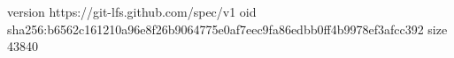 version https://git-lfs.github.com/spec/v1
oid sha256:b6562c161210a96e8f26b9064775e0af7eec9fa86edbb0ff4b9978ef3afcc392
size 43840
